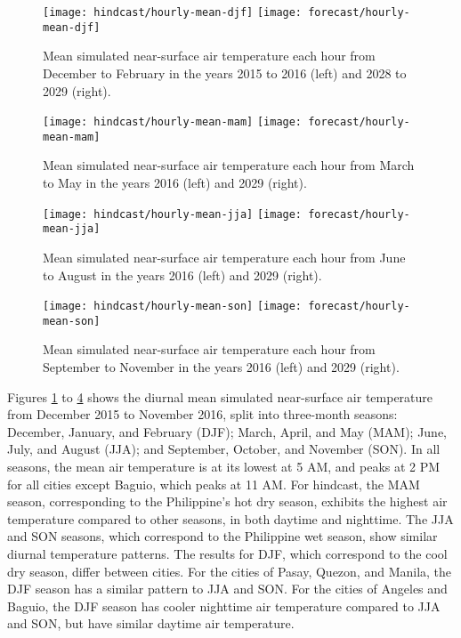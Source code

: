 	\begin{figure}	
		\centering
		\texttt{[image: hindcast/hourly-mean-djf]}		
		\texttt{[image: forecast/hourly-mean-djf]}		
		\caption{
			Mean simulated near-surface air temperature each hour from December to February in the years 2015 to 2016 (left) and 2028 to 2029 (right).
		}
		\label{fig:hourly-mean-djf}
	\end{figure}
	
	\begin{figure}	
		\centering
		\texttt{[image: hindcast/hourly-mean-mam]}		
		\texttt{[image: forecast/hourly-mean-mam]}		
		\caption{
			Mean simulated near-surface air temperature each hour from March to May in the years 2016 (left) and 2029 (right).
		}
		\label{fig:hourly-mean-mam}
	\end{figure}
	
	\begin{figure}	
		\centering
		\texttt{[image: hindcast/hourly-mean-jja]}		
		\texttt{[image: forecast/hourly-mean-jja]}		
		\caption{
			Mean simulated near-surface air temperature each hour from June to August in the years 2016 (left) and 2029 (right).
		}
		\label{fig:hourly-mean-jja}
	\end{figure}	
	
	\begin{figure}	
		\centering
		\texttt{[image: hindcast/hourly-mean-son]}		
		\texttt{[image: forecast/hourly-mean-son]}		
		\caption{
			Mean simulated near-surface air temperature each hour from September to November in the years 2016 (left) and 2029 (right).
		}
		\label{fig:hourly-mean-son}
	\end{figure}

	Figures \ref{fig:hourly-mean-djf} to \ref{fig:hourly-mean-son} shows the diurnal mean simulated near-surface air temperature from December 2015 to November 2016, split into three-month seasons:
		December, January, and February (DJF);
		March, April, and May (MAM);
		June, July, and August (JJA);
		and
		September, October, and November (SON).
	In all seasons, the mean air temperature is at its lowest at 5 AM, and peaks at 2 PM for all cities except Baguio, which peaks at 11 AM.
	For hindcast, the MAM season, corresponding to the Philippine's hot dry season, exhibits the highest air temperature compared to other seasons, in both daytime and nighttime.
	The JJA and SON seasons, which correspond to the Philippine wet season, show similar diurnal temperature patterns.
	The results for DJF, which correspond to the cool dry season, differ between cities.
	For the cities of Pasay, Quezon, and Manila, the DJF season has a similar pattern to JJA and SON.
	For the cities of Angeles and Baguio, the DJF season has cooler nighttime air temperature compared to JJA and SON, but have similar daytime air temperature.
	
